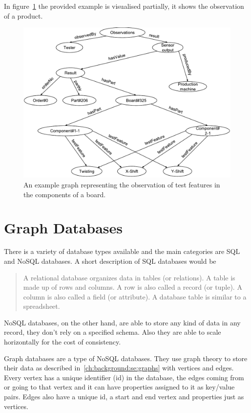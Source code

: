 In figure~\ref{fig:exampleData} the provided example is visualised partially,
it shows the observation of a product.

\begin{figure}
  \centering
  \includegraphics[width=\textwidth]{images/design/exampleGraph}
  \caption{An example graph representing the observation of test features in the components of a board.}
  \label{fig:exampleData}
\end{figure}

\section{Graph Databases}
\label{ch:background:se:graphDatabases}
There is a variety of database types available and the main categories are SQL and NoSQL databases.
A short description of SQL databases would be
\blockquote[\cite{ChuaHock-Chuan}]{A relational database organizes data in tables (or relations).
A table is made up of rows and columns.
A row is also called a record (or tuple).
A column is also called a field (or attribute).
A database table is similar to a spreadsheet.}

NoSQL databases,
on the other hand,
are able to store any kind of data in any record,
they don't rely on a specified schema.
Also they are able to scale horizontally for the cost of consistency.~\cite{Yegulalp2017}

Graph databases are a type of NoSQL databases.
They use graph theory to store their data as described in~\ref{ch:background:se:graphs} with vertices and edges.
Every vertex has a unique identifier (id) in the database,
the edges coming from or going to that vertex and it can have properties assigned to it as key/value pairs.
Edges also have a unique id,
a start and end vertex and properties just as vertices.~\cite{Rouse2016}

